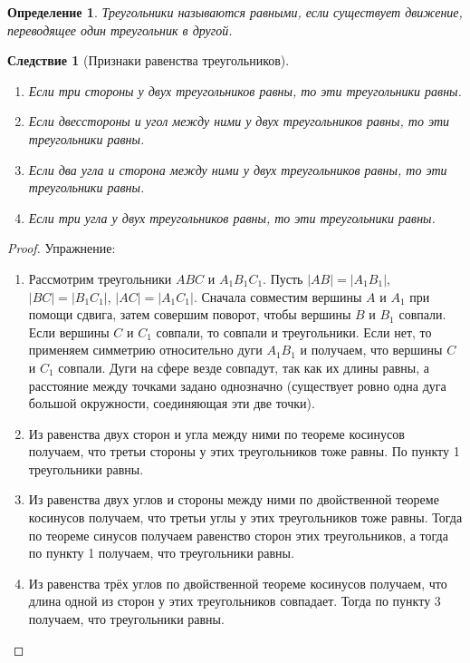 \documentclass[12pt]{article}
\newcommand\tab[1][.5cm]{\hspace*{#1}}
\theoremstyle{plain}
\newtheorem{consequence}{Следствие}[theorem]
\newtheorem{definition}{Определение}[section]
\begin{document}
    \begin{definition}
        Треугольники называются равными, если существует движение, переводящее один треугольник в другой.
    \end{definition}
    \begin{consequence}[Признаки равенства треугольников]\tab
        \begin{enumerate}
            \item Если три стороны у двух треугольников равны, то эти треугольники равны.
            \item Если двесстороны и угол между ними у двух треугольников равны, то эти треугольники равны.
            \item Если два угла и сторона между ними у двух треугольников равны, то эти треугольники равны.
            \item Если три угла у двух треугольников равны, то эти треугольники равны.
        \end{enumerate}
    \end{consequence}
    \begin{proof}
        Упражнение:
        \begin{enumerate}
            \item Рассмотрим треугольники $ABC$ и $A_1B_1C_1$. Пусть $|AB|=|A_1B_1|$, $|BC|=|B_1C_1|$, $|AC|=|A_1C_1|$. Сначала совместим вершины $A$ и $A_1$ при помощи сдвига, затем совершим поворот, чтобы вершины $B$ и $B_1$ совпали. Если вершины $C$ и $C_1$ совпали, то совпали и треугольники. Если нет, то применяем симметрию относительно дуги $A_1B_1$ и получаем, что вершины $C$ и $C_1$ совпали. Дуги на сфере везде совпадут, так как их длины равны, а расстояние между точками задано однозначно (существует ровно одна дуга большой окружности, соединяющая эти две точки).
            \item Из равенства двух сторон и угла между ними по теореме косинусов получаем, что третьи стороны у этих треугольников тоже равны. По пункту 1 треугольники равны.
            \item Из равенства двух углов и стороны между ними по двойственной теореме косинусов получаем, что третьи углы у этих треугольников тоже равны. Тогда по теореме синусов получаем равенство сторон этих треугольников, а тогда по пункту 1 получаем, что треугольники равны.
            \item Из равенства трёх углов по двойственной теореме косинусов получаем, что длина одной из сторон у этих треугольников совпадает. Тогда по пункту 3 получаем, что треугольники равны.
        \end{enumerate}
    \end{proof}
\end{document}
